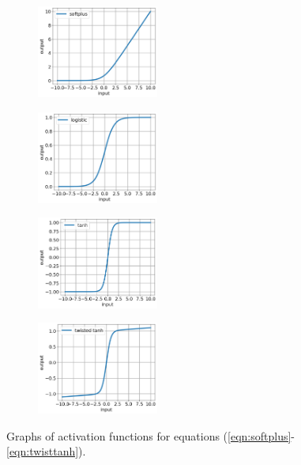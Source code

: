 \documentclass[12pt]{article}
\newcommand{\nhghalfwidth}{0.48\linewidth}
\begin{document}
%
\begin{figure}[!h]
  \centering
  \begin{subfigure}[t]{\nhghalfwidth}
    \centering
    \includegraphics[width=4cm]{Figures/scripts/softplus.png}
  \end{subfigure}
  \begin{subfigure}[t]{\nhghalfwidth}
    \centering
    \includegraphics[width=4cm]{Figures/scripts/logistic.png}
  \end{subfigure}
  \begin{subfigure}[t]{\nhghalfwidth}
    \centering   
    \includegraphics[width=4cm]{Figures/scripts/tanh.png}
  \end{subfigure}
  \begin{subfigure}[t]{\nhghalfwidth}
    \centering
    \includegraphics[width=4cm]{Figures/scripts/twistedtanh.png}
  \end{subfigure}
\caption{\label{fig:activations} Graphs of activation functions for equations (\ref{eqn:softplus}-\ref{eqn:twisttanh}).}
\end{figure}
%
\end{document}
